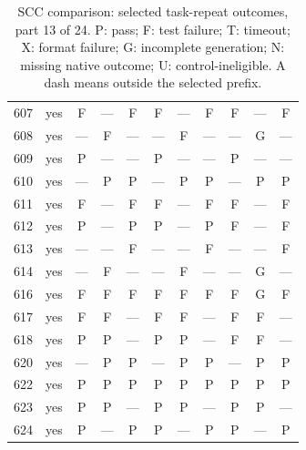 \begin{table}[p]
\begin{tabular*}{\textwidth}{@{\extracolsep{\fill}}rc*{9}{c}@{}}
607 & yes & F & — & F & F & — & F & F & — & F\\
608 & yes & — & F & — & — & F & — & — & G & —\\
609 & yes & P & — & — & P & — & — & P & — & —\\
610 & yes & — & P & P & — & P & P & — & P & P\\
611 & yes & F & — & F & F & — & F & F & — & F\\
612 & yes & P & — & P & P & — & P & F & — & F\\
613 & yes & — & — & F & — & — & F & — & — & F\\
614 & yes & — & F & — & — & F & — & — & G & —\\
616 & yes & F & F & F & F & F & F & F & G & F\\
617 & yes & F & F & — & F & F & — & F & F & —\\
618 & yes & P & P & — & P & P & — & F & F & —\\
620 & yes & — & P & P & — & P & P & — & P & P\\
622 & yes & P & P & P & P & P & P & P & P & P\\
623 & yes & P & P & — & P & P & — & P & P & —\\
624 & yes & P & — & P & P & — & P & P & — & P\\
\bottomrule\end{tabular*}
\caption{SCC comparison: selected task-repeat outcomes, part 13 of 24. P: pass; F: test failure; T: timeout; X: format failure; G: incomplete generation; N: missing native outcome; U: control-ineligible. A dash means outside the selected prefix.}
\end{table}
\clearpage
